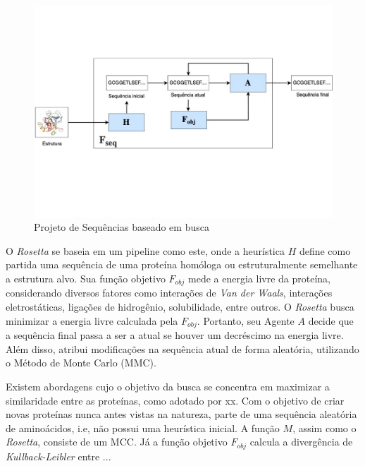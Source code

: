 \begin{figure}[H]
  \centering
  \includegraphics[width=.8\textwidth]{figuras/metodologia-SearchBased.pdf}
  \caption{Projeto de Sequências baseado em busca} 
  \label{fig:seqdes_search_based}
\end{figure}


O \textit{Rosetta} \cite{Rosetta} se baseia em um pipeline como este, onde a heurística $H$ define como partida uma sequência de uma proteína homóloga ou estruturalmente semelhante a estrutura alvo.  
Sua função objetivo $F_{obj}$ mede a energia livre da proteína, considerando diversos fatores como interações de \textit{Van der Waals}, interações eletrostáticas, ligações de hidrogênio, solubilidade, entre outros. 
O \textit{Rosetta} busca minimizar a energia livre calculada pela $F_{obj}$. Portanto, seu Agente $A$ 
decide que a sequência final passa a ser a atual se houver um decréscimo na energia livre. Além disso, atribui modificações na sequência atual de forma aleatória, utilizando o Método de Monte Carlo (MMC).


{\color{red} Existem abordagens cujo o objetivo da busca se concentra em maximizar a similaridade entre as proteínas, como adotado por xx. Com o objetivo de criar novas proteínas nunca antes vistas na natureza, \cite{DeNovo} parte de uma sequência aleatória de aminoácidos, i.e, não possui uma heurística inicial. A função $M$, assim como o \textit{Rosetta}, consiste de um MCC. Já a função objetivo $F_{obj}$ calcula a divergência de \textit{Kullback-Leibler} entre ...}



